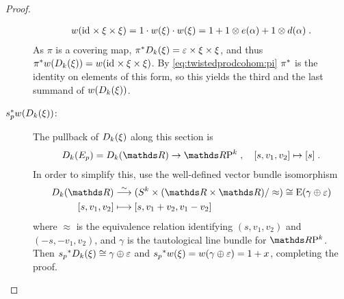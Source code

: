 \begin{Cor}
\begin{proof}
\begin{description}
\begin{gather*}
        {w}(\mathrm{id}_{}\times\xi\times\xi)
        = 1\cdot {w}(\xi)\cdot{w}(\xi)
        = 1 + 1\otimes e(\alpha) + 1\otimes d(\alpha)
        \;.
      \end{gather*}
      As $\pi$ is a covering map,
      ${\pi}^*D_{k}({\xi})=\varepsilon\times\xi\times\xi$,
      and thus
      ${\pi}^*{w}(D_{k}({\xi}))={w}(\mathrm{id}_{}\times\xi\times\xi)$.
      By \eqref{eq:twistedprodcohom:pi} ${\pi}^*$ is the identity on
      elements of this form, so this yields the third and the last
      summand of ${w}(D_{k}({\xi}))$.
    \item[${s}^*_p {w}(D_{k}({\xi}))$:]
        The pullback of $D_{k}({\xi})$ along this section is
        \begin{gather*}
          \Twistedprod{k}{E_p}=\Twistedprod{k}{\R}\to \RP k
          \;,\quad
          [s, v_1,v_2] \mapsto [s]
          \;.
        \end{gather*}
        In order to simplify this, use the well-defined vector bundle
        isomorphism
        \begin{align*}
          \Twistedprod{k}{\R}
          &\overset{\sim}\longto
            (\Twistedprodcovspace{k}{\R}/\approx)
            \cong \E{(\gamma\oplus\trivbdl)} \\
          [s, v_1, v_2]
          &\longmapsto
            [s, v_1+v_2, v_1-v_2]
        \end{align*}
        where $\approx$ is the equivalence relation identifying
        $(s,v_1,v_2)$ and $(-s,-v_1,v_2)$, and
        $\gamma$ is the tautological line bundle for $\RP k$.
        Then ${s_p}^*D_{k}({\xi}) \cong
        \gamma\oplus\varepsilon$ and ${s_p}^*{w}(\xi) =
        {w}(\gamma\oplus\varepsilon) = 1+x$, completing the proof.
      \end{description}
    \end{proof}
\end{Cor}

